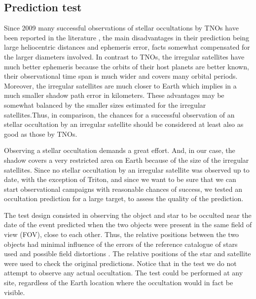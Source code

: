 \documentclass[useAMS,usenatbib]{mn2e}
\begin{document}
\subsection{Prediction test} \label{Sec: testes}

Since 2009 many successful observations of stellar occultations by TNOs have been reported in the literature \citep{Elliot2010, Sicardy2011, Ortiz2012, Braga-Ribas2013}, the main disadvantages in their prediction being large heliocentric distances and ephemeris error, facts somewhat compensated for the larger diameters involved. In contrast to TNOs, the irregular satellites have much better ephemeris because the orbits of their host planets are better  known, their observational time span is much wider and covers many orbital periods. Moreover, the irregular satellites are much closer to Earth which implies in a much smaller shadow path error in kilometers. These advantages may be somewhat balanced by the smaller sizes estimated for the irregular satellites.Thus, in comparison, the chances for a successful observation of an stellar occultation by an irregular satellite should be considered at least also as good as those by TNOs.

Observing a stellar occultation demands a great effort. And, in our case, the shadow covers a very restricted area on Earth because of the size of the irregular satellites. Since no stellar occultation by an irregular satellite was observed up to date, with the exception of Triton, and since we want to be sure that we can start observational campaigns with reasonable chances of success, we tested an occultation prediction for a large target, to assess the quality of the prediction.

The test design consisted in observing the object and star to be occulted near the date of the event predicted when the two objects were present in the same field of view (FOV), close to each other. Thus, the relative positions between the two objects had minimal influence of the errors of the reference catalogue of stars used and possible field distortions \citep[and references therein]{Peng2008}. The relative positions of the star and satellite were used to check the original predictions. Notice that in the test we do not attempt to observe any actual occultation. The test could be performed at any site, regardless of the Earth location where the occultation would in fact be visible. 
\end{document}
